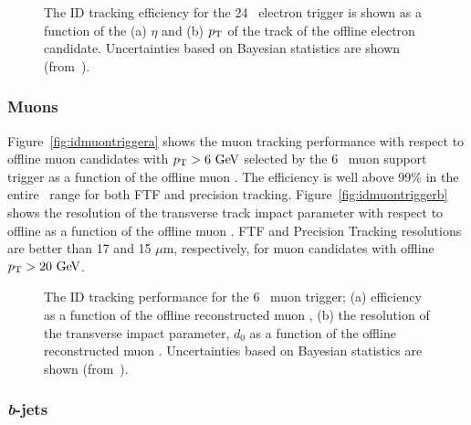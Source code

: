 				\begin{figure}[!htb]
					\centering
					\caption{The ID tracking efficiency for the 24 \GeV\ electron trigger is shown as a function of the (a) $\eta$ and (b) $p_{\mathrm{T}}$ of the track of the offline electron candidate. Uncertainties based on Bayesian statistics are shown (from~\cite{ATLASTrigger2015}).}
					\label{fig:ele_idtrig_eff}
				\end{figure}

			\subsubsection*{Muons}

				Figure~\ref{fig:idmuontriggera} shows the muon tracking performance with respect to offline muon candidates with $\pt > 6 \GeV$ selected by the 6 \GeV\ muon support trigger as a function of the offline muon \pt. The efficiency is well above 99\% in the entire \pt\ range for both FTF and precision tracking. Figure~\ref{fig:idmuontriggerb} shows the resolution of the transverse track impact parameter with respect to offline as a function of the offline muon \pt. FTF and Precision Tracking resolutions are better than 17 and 15 $\mu$m, respectively, for muon candidates with offline $\pt > 20 \GeV$.

				\begin{figure}[!htb]
					\centering
					\caption{ 
					The ID tracking performance for the 6 \GeV\ muon trigger;
					(a) efficiency as a function of the offline reconstructed muon \pt,  
					(b) the resolution of the transverse impact parameter, $d_{0}$  as a function of the offline reconstructed muon \pt. Uncertainties based on Bayesian statistics are shown (from~\cite{ATLASTrigger2015}).}
				\label{fig:idmuontrigger}
				\end{figure}



			\subsubsection*{\emph{b}-jets}

